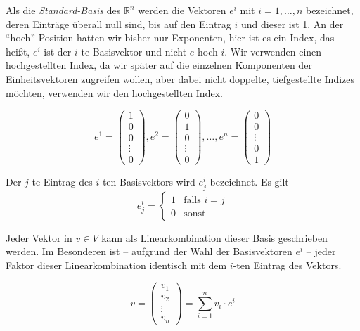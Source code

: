 \begin{definition}
Als die \textsl{Standard-Basis} des $\mathbb{R}^n$ werden die Vektoren $e^i$ mit $i=1,\dots,n$ bezeichnet, deren Einträge überall null sind, bis auf den Eintrag $i$ und dieser ist 1. An der "`hoch"' Position hatten wir bisher nur Exponenten, hier ist es ein Index, das heißt, $e^i$ ist der $i$-te Basisvektor und nicht $e$ hoch $i$. Wir verwenden einen hochgestellten Index, da wir später auf die einzelnen Komponenten der Einheitsvektoren zugreifen wollen, aber dabei nicht doppelte, tiefgestellte Indizes möchten, verwenden wir den hochgestellten Index. 

\begin{equation}
e^1 = \begin{pmatrix}
1\\
0\\
0\\
\vdots \\
0
\end{pmatrix}, e^2 = \begin{pmatrix}
0\\
1\\
0\\
\vdots \\
0
\end{pmatrix}, \dots, e^n = \begin{pmatrix}
0\\
0\\
\vdots \\
0\\
1
\end{pmatrix}
\end{equation}
\end{definition}

Der $j$-te Eintrag des $i$-ten Basisvektors wird $e^i_j$ bezeichnet. Es gilt
\begin{equation*}
e^i_j = \begin{cases}
1 & \text{falls } i=j \\
0 & \text{sonst}
\end{cases}
\end{equation*}

Jeder Vektor in $v\in V$ kann als Linearkombination dieser Basis geschrieben werden. Im Besonderen ist -- aufgrund der Wahl der Basisvektoren $e^i$ -- jeder Faktor dieser Linearkombination identisch mit dem $i$-ten Eintrag des Vektors. 

\[
v = \begin{pmatrix}
v_1 \\
v_2 \\
\vdots \\
v_n
\end{pmatrix} = \sum_{i=1}^{n} v_i \cdot e^i
\]


